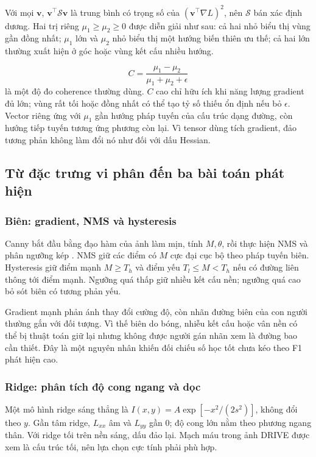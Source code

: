 Với mọi $\mathbf v$, $\mathbf v^\top\mathcal S\mathbf v$ là trung bình có trọng số của $(\mathbf v^\top\nabla L)^2$, nên $\mathcal S$ bán xác định dương. Hai trị riêng $\mu_1\geq\mu_2\geq0$ được diễn giải như sau: cả hai nhỏ biểu thị vùng gần đồng nhất; $\mu_1$ lớn và $\mu_2$ nhỏ biểu thị một hướng biến thiên ưu thế; cả hai lớn thường xuất hiện ở góc hoặc vùng kết cấu nhiều hướng.

\begin{equation}
C=\frac{\mu_1-\mu_2}{\mu_1+\mu_2+\epsilon}
\end{equation}
là một độ đo coherence thường dùng. $C$ cao chỉ hữu ích khi năng lượng gradient đủ lớn; vùng rất tối hoặc đồng nhất có thể tạo tỷ số thiếu ổn định nếu bỏ $\epsilon$. Vector riêng ứng với $\mu_1$ gần hướng pháp tuyến của cấu trúc dạng đường, còn hướng tiếp tuyến tương ứng phương còn lại. Vì tensor dùng tích gradient, đảo tương phản không làm đổi nó như đối với dấu Hessian.

\subsection{Từ đặc trưng vi phân đến ba bài toán phát hiện}
\subsubsection{Biên: gradient, NMS và hysteresis}
Canny bắt đầu bằng đạo hàm của ảnh làm mịn, tính $M,\theta$, rồi thực hiện NMS và phân ngưỡng kép \cite{canny1986computational}. NMS giữ các điểm có $M$ cực đại cục bộ theo pháp tuyến biên. Hysteresis giữ điểm mạnh $M\geq T_h$ và điểm yếu $T_l\leq M<T_h$ nếu có đường liên thông tới điểm mạnh. Ngưỡng quá thấp giữ nhiều kết cấu nền; ngưỡng quá cao bỏ sót biên có tương phản yếu.

Gradient mạnh phản ánh thay đổi cường độ, còn nhãn đường biên của con người thường gắn với đối tượng. Vì thế biên do bóng, nhiễu kết cấu hoặc vân nền có thể bị thuật toán giữ lại nhưng không được người gán nhãn xem là đường bao cần thiết. Đây là một nguyên nhân khiến đối chiếu số học tốt chưa kéo theo F1 phát hiện cao.

\subsubsection{Ridge: phân tích độ cong ngang và dọc}
Một mô hình ridge sáng thẳng là $I(x,y)=A\exp[-x^2/(2s^2)]$, không đổi theo $y$. Gần tâm ridge, $L_{xx}$ âm và $L_{yy}$ gần 0; độ cong lớn nằm theo phương ngang thân. Với ridge tối trên nền sáng, dấu đảo lại. Mạch máu trong ảnh DRIVE được xem là cấu trúc tối, nên lựa chọn cực tính phải phù hợp.


